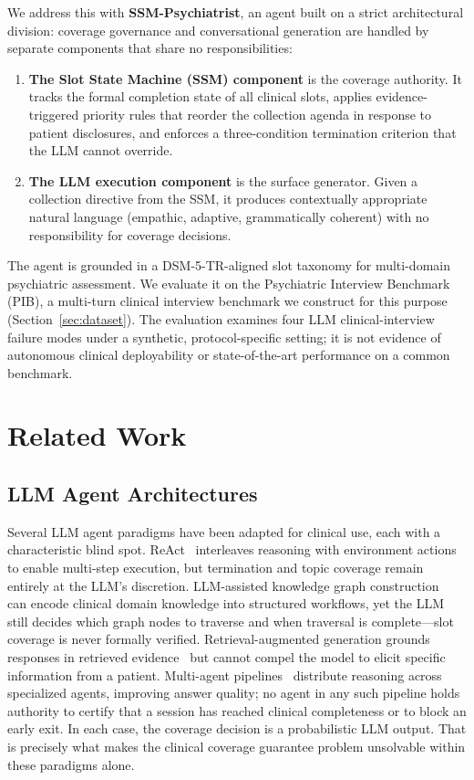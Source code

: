 \documentclass[conference]{IEEEtran}
\begin{document}
We address this with \textbf{SSM-Psychiatrist}, an agent built on a strict architectural division: coverage governance and conversational generation are handled by separate components that share no responsibilities:
\begin{enumerate}
  \item \textbf{The Slot State Machine (SSM) component} is the coverage
  authority. It tracks the formal completion state of all clinical
  slots, applies evidence-triggered priority rules that reorder the
  collection agenda in response to patient disclosures, and enforces a
  three-condition termination criterion that the LLM cannot override.
  \item \textbf{The LLM execution component} is the surface generator.
  Given a collection directive from the SSM, it produces contextually
  appropriate natural language (empathic, adaptive, grammatically
  coherent) with no responsibility for coverage decisions.
\end{enumerate}
The agent is grounded in a DSM-5-TR-aligned slot taxonomy for
multi-domain psychiatric assessment. We evaluate it on the Psychiatric
Interview Benchmark (PIB), a multi-turn clinical interview benchmark we
construct for this purpose (Section~\ref{sec:dataset}). The evaluation
examines four LLM clinical-interview failure modes under a synthetic,
protocol-specific setting; it is not evidence of autonomous clinical
deployability or state-of-the-art performance on a common benchmark.

\section{Related Work}

\subsection{LLM Agent Architectures}

Several LLM agent paradigms have been adapted for clinical use, each with a characteristic blind spot. ReAct~\cite{yao2022react} interleaves reasoning with environment actions to enable multi-step execution, but termination and topic coverage remain entirely at the LLM's discretion. LLM-assisted knowledge graph construction~\cite{yang2024kgllm} can encode clinical domain knowledge into structured workflows, yet the LLM still decides which graph nodes to traverse and when traversal is complete---slot coverage is never formally verified. Retrieval-augmented generation grounds responses in retrieved evidence~\cite{zhan2024rarok} but cannot compel the model to elicit specific information from a patient. Multi-agent pipelines~\cite{kim2024mdagents,liu2024medgen} distribute reasoning across specialized agents, improving answer quality; no agent in any such pipeline holds authority to certify that a session has reached clinical completeness or to block an early exit. In each case, the coverage decision is a probabilistic LLM output. That is precisely what makes the clinical coverage guarantee problem unsolvable within these paradigms alone.
\end{document}
